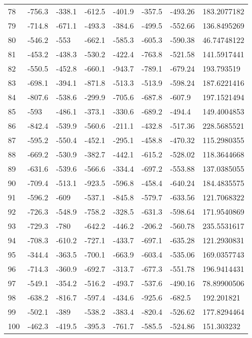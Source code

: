 \begin{table}[h]
\begin{tabular}{llllllll}
78      & -756.3  & -338.1  & -612.5  & -401.9  & -357.5  & -493.26  & 183.2077182        \\
79      & -714.8  & -671.1  & -493.3  & -384.6  & -499.5  & -552.66  & 136.8495269        \\
80      & -546.2  & -553    & -662.1  & -585.3  & -605.3  & -590.38  & 46.74748122        \\
81      & -453.2  & -438.3  & -530.2  & -422.4  & -763.8  & -521.58  & 141.5917441        \\
82      & -550.5  & -452.8  & -660.1  & -943.7  & -789.1  & -679.24  & 193.793519         \\
83      & -698.1  & -394.1  & -871.8  & -513.3  & -513.9  & -598.24  & 187.6221416        \\
84      & -807.6  & -538.6  & -299.9  & -705.6  & -687.8  & -607.9   & 197.1521494        \\
85      & -593    & -486.1  & -373.1  & -330.6  & -689.2  & -494.4   & 149.4004853        \\
86      & -842.4  & -539.9  & -560.6  & -211.1  & -432.8  & -517.36  & 228.5685521        \\
87      & -595.2  & -550.4  & -452.1  & -295.1  & -458.8  & -470.32  & 115.2980355        \\
88      & -669.2  & -530.9  & -382.7  & -442.1  & -615.2  & -528.02  & 118.3644668        \\
89      & -631.6  & -539.6  & -566.6  & -334.4  & -697.2  & -553.88  & 137.0385055        \\
90      & -709.4  & -513.1  & -923.5  & -596.8  & -458.4  & -640.24  & 184.4835575        \\
91      & -596.2  & -609    & -537.1  & -845.8  & -579.7  & -633.56  & 121.7068322        \\
92      & -726.3  & -548.9  & -758.2  & -328.5  & -631.3  & -598.64  & 171.9540869        \\
93      & -729.3  & -780    & -642.2  & -446.2  & -206.2  & -560.78  & 235.5531617        \\
94      & -708.3  & -610.2  & -727.1  & -433.7  & -697.1  & -635.28  & 121.2930831        \\
95      & -344.4  & -363.5  & -700.1  & -663.9  & -603.4  & -535.06  & 169.0357743        \\
96      & -714.3  & -360.9  & -692.7  & -313.7  & -677.3  & -551.78  & 196.9414431        \\
97      & -549.1  & -354.2  & -516.2  & -493.7  & -537.6  & -490.16  & 78.89900506        \\
98      & -638.2  & -816.7  & -597.4  & -434.6  & -925.6  & -682.5   & 192.201821         \\
99      & -502.1  & -389    & -538.2  & -383.4  & -820.4  & -526.62  & 177.8294464        \\
100     & -462.3  & -419.5  & -395.3  & -761.7  & -585.5  & -524.86  & 151.303232        
\end{tabular}
\end{table}
